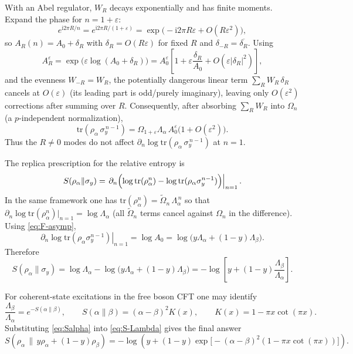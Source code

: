 \documentclass[11pt]{article}
\newcommand{\tr}{\mathrm{tr}}
\newcommand{\ii}{\mathrm{i}}
\newcommand{\eps}{\varepsilon}
\begin{document}
With an Abel regulator, $W_R$ decays exponentially and has finite moments.
Expand the phase for $n=1+\eps$:
\begin{equation}
e^{\ii2\pi R/n}=e^{\ii2\pi R/(1+\eps)}=\exp\!\bigl(-\ii2\pi R\eps+O(R\eps^2)\bigr),
\end{equation}
so $A_R(n)=A_0+\delta_R$ with $\delta_R=O(R\eps)$ for fixed $R$ and
$\delta_{-R}=\overline{\delta_R}$. Using
\begin{equation}
A_R^{\eps}=\exp\!\bigl(\eps\log(A_0+\delta_R)\bigr)=A_0^{\eps}\left[1+\eps\frac{\delta_R}{A_0}+O(\eps|\delta_R|^2)\right],
\end{equation}
and the evenness $W_{-R}=W_R$, the potentially dangerous linear term
$\sum_R W_R\,\delta_R$ cancels at $O(\eps)$ (its leading part is odd/purely imaginary),
leaving only $O(\eps^2)$ corrections after summing over $R$.
Consequently, after absorbing $\sum_R W_R$ into $\Omega_n$ (a $p$-independent normalization),
\begin{equation}
\tr(\rho_\alpha\,\sigma_y^{\,n-1})
=\Omega_{1+\eps}\Lambda_\alpha\,A_0^{\eps}\bigl(1+O(\eps^2)\bigr).
\label{eq:F-asymp}
\end{equation}
Thus the $R\neq 0$ modes do not affect $\partial_n\log \tr(\rho_\alpha\,\sigma_y^{\,n-1})$ at $n=1$.

The replica prescription for the relative entropy is
\begin{equation}
S(\rho_\alpha\|\sigma_y)=
\left.\partial_n\Bigl(\log \tr(\rho_\alpha^n)-\log \tr(\rho_\alpha\sigma_y^{n-1})\Bigr)\right|_{n=1}.
\label{eq:S-replica}
\end{equation}
In the same framework one has $\tr(\rho_\alpha^n)=\widetilde\Omega_n\,\Lambda_\alpha^{\,n}$ so that
$\partial_n\log \tr(\rho_\alpha^n)|_{n=1}=\log\Lambda_\alpha$ (all $\widetilde\Omega_n$ terms cancel
against $\Omega_n$ in the difference).
Using \eqref{eq:F-asymp},
\begin{equation}
\left.\partial_n\log \tr(\rho_\alpha\sigma_y^{n-1})\right|_{n=1}
=\log A_0=\log\!\bigl(y\Lambda_\alpha+(1-y)\Lambda_\beta\bigr).
\end{equation}
Therefore
\begin{equation}
S(\rho_\alpha\|\sigma_y)=\log\Lambda_\alpha-\log\!\bigl(y\Lambda_\alpha+(1-y)\Lambda_\beta\bigr)
= -\log\!\left[y+(1-y)\frac{\Lambda_\beta}{\Lambda_\alpha}\right].
\label{eq:S-Lambda}
\end{equation}

For coherent-state excitations in the free boson CFT one may identify
\begin{equation}
\frac{\Lambda_\beta}{\Lambda_\alpha}=e^{-S(\alpha\|\beta)},
\qquad
S(\alpha\|\beta)=(\alpha-\beta)^2K(x),
\qquad
K(x)=1-\pi x\cot(\pi x).
\label{eq:Salpha}
\end{equation}
Substituting \eqref{eq:Salpha} into \eqref{eq:S-Lambda} gives the final answer
\begin{equation}
\boxed{
S\!\left(\rho_\alpha\,\Big\|\,y\rho_\alpha+(1-y)\rho_\beta\right)
=
-\log\!\left(
y+(1-y)\exp\!\big[-(\alpha-\beta)^2(1-\pi x\cot(\pi x))\big]
\right).
}
\label{eq:S-final}
\end{equation}
\end{document}
